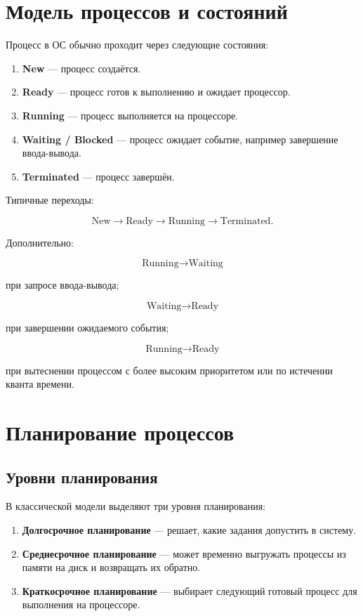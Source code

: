 \documentclass[12pt,a4paper]{article}
\begin{document}
\section{Модель процессов и состояний}

Процесс в ОС обычно проходит через следующие состояния:

\begin{enumerate}
    \item \textbf{New} --- процесс создаётся.
    \item \textbf{Ready} --- процесс готов к выполнению и ожидает процессор.
    \item \textbf{Running} --- процесс выполняется на процессоре.
    \item \textbf{Waiting / Blocked} --- процесс ожидает событие, например завершение ввода-вывода.
    \item \textbf{Terminated} --- процесс завершён.
\end{enumerate}

Типичные переходы:

\[
\text{New} \rightarrow \text{Ready} \rightarrow \text{Running} \rightarrow \text{Terminated}.
\]

Дополнительно:

\[
\text{Running} \rightarrow \text{Waiting}
\]

при запросе ввода-вывода;

\[
\text{Waiting} \rightarrow \text{Ready}
\]

при завершении ожидаемого события;

\[
\text{Running} \rightarrow \text{Ready}
\]

при вытеснении процессом с более высоким приоритетом или по истечении кванта времени.

\section{Планирование процессов}

\subsection{Уровни планирования}

В классической модели выделяют три уровня планирования:

\begin{enumerate}
    \item \textbf{Долгосрочное планирование} --- решает, какие задания допустить в систему.
    \item \textbf{Среднесрочное планирование} --- может временно выгружать процессы из памяти на диск и возвращать их обратно.
    \item \textbf{Краткосрочное планирование} --- выбирает следующий готовый процесс для выполнения на процессоре.
\end{enumerate}
\end{document}

